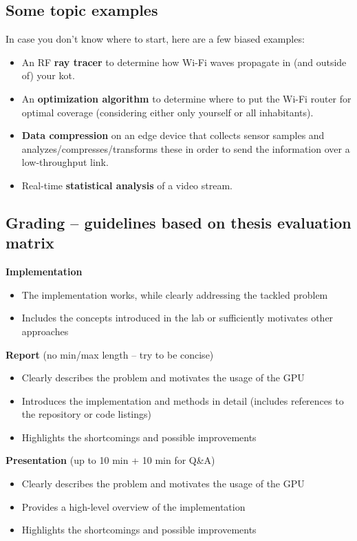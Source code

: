 \documentclass[11pt,a4paper]{article}
\begin{document}
\subsection{Some topic examples}
In case you don't know where to start, here are a few biased examples:
\begin{itemize}
  \item An RF \textbf{ray tracer} to determine how Wi-Fi waves propagate in (and outside of) your kot.
  \item An \textbf{optimization algorithm} to determine where to put the Wi-Fi router for optimal coverage (considering either only yourself or all inhabitants).
  \item \textbf{Data compression} on an edge device that collects sensor samples and analyzes/compresses/transforms these in order to send the information over a low-throughput link.
  \item Real-time \textbf{statistical analysis} of a video stream.
\end{itemize}

\subsection{Grading -- guidelines based on thesis evaluation matrix}

\textbf{Implementation}
\begin{itemize}[nosep]
  \item The implementation works, while clearly addressing the tackled problem
  \item Includes the concepts introduced in the lab or sufficiently motivates other approaches
\end{itemize}

\textbf{Report} (no min/max length -- try to be concise)
\begin{itemize}[nosep]
  \item Clearly describes the problem and motivates the usage of the GPU
  \item Introduces the implementation and methods in detail (includes references to the repository or code listings)
  \item Highlights the shortcomings and possible improvements
\end{itemize}

\textbf{Presentation} (up to 10 min + 10 min for Q\&A)
\begin{itemize}[nosep]
  \item Clearly describes the problem and motivates the usage of the GPU
  \item Provides a high-level overview of the implementation
  \item Highlights the shortcomings and possible improvements
\end{itemize}
\end{document}
